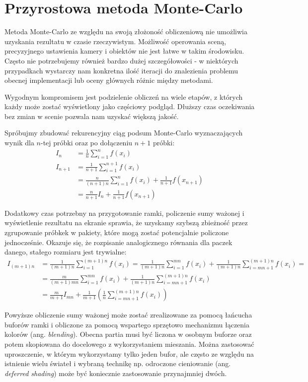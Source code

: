 \documentclass[../main.tex]{subfiles}
\begin{document}
\section{Przyrostowa metoda Monte-Carlo}

Metoda Monte-Carlo ze względu na swoją złożoność obliczeniową nie umożliwia uzyskania rezultatu w czasie rzeczywistym. Możliwość operowania sceną, precyzyjnego ustawienia kamery i obiektów nie jest łatwe w takim środowisku. Często nie potrzebujemy również bardzo dużej szczegółowości - w niektórych przypadkach wystarczy nam konkretna ilość iteracji do znalezienia problemu obecnej implementacji lub oceny głównych różnic między metodami.

Wygodnym kompromisem jest podzielenie obliczeń na wiele etapów, z których każdy może zostać wyświetlony jako częściowy podgląd. Dłuższy czas oczekiwania bez zmian w scenie pozwala nam uzyskać większą jakość.

Spróbujmy zbudować rekurencyjny ciąg podsum Monte-Carlo wyznaczających wynik dla $n$-tej próbki oraz po dołączeniu $n+1$ próbki:
\begin{align*}
I_n &= \frac{1}{n} \sum_{i=1}^{n} f(x_i) \\
I_{n+1} &= \frac{1}{n+1} \sum_{i=1}^{n+1}f(x_i) \\
	&= \frac{n}{(n+1)n} \sum_{i=1}^{n}f(x_i) + \frac{1}{n+1}f(x_{n+1}) \\
	&= \frac{n}{n+1} I_{n} + \frac{1}{n+1}f(x_{n+1})
\end{align*}

Dodatkowy czas potrzebny na przygotowanie ramki, policzenie sumy ważonej i wyświetlenie rezultatu na ekranie sprawia, że uzyskamy szybszą zbieżność przez zgrupowanie próbkek w pakiety, które mogą zostać potencjalnie policzone jednocześnie. Okazuje się, że rozpisanie analogicznego równania dla paczek danego, stałego rozmiaru jest trywialne:
\begin{align*}
  I_{(m+1)n} &= \frac{1}{(m+1)n} \sum_{i=1}^{(m+1)n} f(x_i)
  = \frac{1}{(m+1)n} \sum_{i=1}^{mn} f(x_i)
    + \frac{1}{(m+1)n} \sum_{i=mn+1}^{(m+1)n} f(x_i) = \\
  &= \frac{m}{(m+1)mn} \sum_{i=1}^{mn} f(x_i)
    + \frac{1}{(m+1)n} \sum_{i=mn+1}^{(m+1)n} f(x_i) \\
  &= \frac{m}{m+1}I_{mn}
    + \frac{1}{m+1} \left(
        \frac{1}{n} \sum_{i=mn+1}^{(m+1)n} f(x_i)
    \right)
\end{align*}

Powyższe obliczenie sumy ważonej może zostać zrealizowane za pomocą łańcucha buforów ramki i obliczone za pomocą wspartego sprzętowo mechanizmu łączenia kolorów (ang. \textit{blending}). Obecna partia musi być liczona w osobnym buforze oraz potem skopiowana do docelowego z wykorzystaniem mieszania. Można zastosować uproszczenie, w którym wykorzystamy tylko jeden bufor, ale często ze względu na istnienie wielu świateł i wybraną technikę np. odroczone cieniowanie (ang. \textit{deferred shading}) może być koniecznie zastosowanie przynajmniej dwóch.
\end{document}

